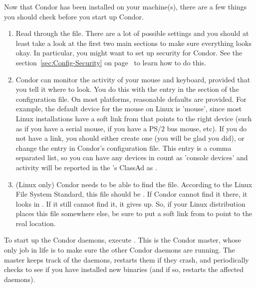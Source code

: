 Now that Condor has been installed on your machine(s), there are a few
things you should check before you start up Condor.

\begin{enumerate}
\item Read through the  file.  There are a
    lot of possible settings and you should at least take a look at
    the first two main sections to make sure everything looks okay.
    In particular, you might want to set up security for
    Condor.  See the section~\ref{sec:Config-Security} on
    page~\pageref{sec:Config-Security} to learn how to do this.

\item Condor can monitor the activity of your mouse and keyboard,
    provided that you tell it where to look.  You do this with the
     entry in the  section of
    the configuration file.  On most platforms, reasonable
    defaults are provided.
    For example, the default device for the mouse on Linux
    is 'mouse', since most Linux installations have a soft link from
     that points to the right device (such as
     if you have a serial mouse,  if you have
    a PS/2 bus mouse, etc).  If you do not have a 
    link, you should either create one (you will be glad you did), or
    change the  entry in Condor's
    configuration file.
    This entry is a comma separated list, so you can have any
    devices in  count as 'console devices' and activity
    will be reported in the 's ClassAd as
    .

\item  (Linux only) Condor needs to be able to find the  file.
    According to the Linux File System Standard, this file should be
    .  If Condor cannot find it there, it looks in
    .  If it still cannot find it, it gives up.  So, if
    your Linux distribution places this file somewhere else, be sure to
    put a soft link from  to point to the real location.

\end{enumerate}

To start up the Condor daemons, execute
.  This is the Condor master, whose
only job in life is to make sure the other Condor daemons are running.
The master keeps track of the daemons, restarts them if they crash,
and periodically checks to see if you have installed new binaries (and
if so, restarts the affected daemons).

